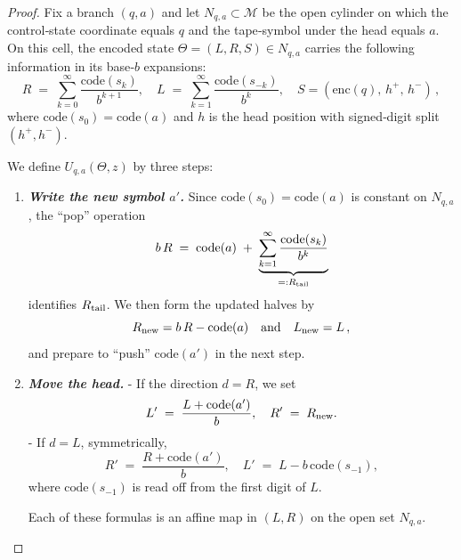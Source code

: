 \documentclass[12pt]{article}
\theoremstyle{definition}
\theoremstyle{plain}
\begin{document}
\begin{proof}
Fix a branch \((q,a)\) and let \(N_{q,a}\subset\mathcal M\) be the open cylinder on which the control‐state coordinate equals \(q\) and the tape‐symbol under the head equals \(a\).  On this cell, the encoded state \(\Theta=(L,R,S)\in N_{q,a}\) carries the following information in its base‑\(b\) expansions:
\[
  R \;=\;\sum_{k=0}^\infty \frac{\mathrm{code}(s_k)}{b^{k+1}},
  \quad
  L \;=\;\sum_{k=1}^\infty \frac{\mathrm{code}(s_{-k})}{b^k},
  \quad
  S=(\mathrm{enc}(q),\,h^+,\,h^-)\,,
\]
where \(\mathrm{code}(s_0)=\mathrm{code}(a)\) and \(h\) is the head position with signed‐digit split \((h^+,h^-)\).

We define \(U_{q,a}(\Theta,z)\) by three steps:
\begin{enumerate}

\item \textbf{\textit{Write the new symbol \(a'\).}}  
   Since \(\mathrm{code}(s_0)=\mathrm{code}(a)\) is constant on \(N_{q,a}\), the “pop” operation
   \[
     b\,R \;=\;\mathrm{code}(a)\;+\;\underbrace{\sum_{k=1}^\infty \frac{\mathrm{code}(s_k)}{b^k}}_{=:R_{\rm tail}}
   \]
   identifies \(R_{\rm tail}\).  We then form the updated halves by
   \[
     R_{\rm new}
     = b\,R - \mathrm{code}(a)
     \quad\text{and}\quad
     L_{\rm new} = L\,,
   \]
   and prepare to “push” \(\mathrm{code}(a')\) in the next step.

\item \textbf{\textit{Move the head.}}
   - If the direction \(d=R\), we set
     \[
       L' \;=\;\frac{L + \mathrm{code}(a')}{b},
       \quad
       R' \;=\;R_{\rm new}.
     \]
   - If \(d=L\), symmetrically,
     \[
       R' \;=\;\frac{R + \mathrm{code}(a')}{b},
       \quad
       L' \;=\;L - b\,\mathrm{code}(s_{-1}),
     \]
     where \(\mathrm{code}(s_{-1})\) is read off from the first digit of \(L\).  

   Each of these formulas is an affine map in \((L,R)\) on the open set \(N_{q,a}\).


\end{enumerate}
\end{proof}
\end{document}
